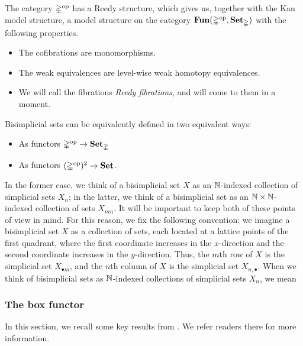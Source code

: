 \documentclass[main.tex]{subfiles}
\begin{document}
\begin{appendix}
  The category $\mathbb{\Delta}^{\mathrm{op}}$ has a Reedy structure, which gives us, together with the Kan model structure, a model structure on the category $\mathbf{Fun}(\mathbb{\Delta}^{\mathrm{op}}, \mathbf{Set}_{\mathbb{\Delta}})$ with the following properties.
  \begin{itemize}
    \item The cofibrations are monomorphisms.

    \item The weak equivalences are level-wise weak homotopy equivalences.

    \item We will call the fibrations \emph{Reedy fibrations,} and will come to them in a moment.
  \end{itemize}



  Bisimplicial sets can be equivalently defined in two equivalent ways:
  \begin{itemize}
    \item As functors $\mathbb{\Delta}^{\mathrm{op}} \to \mathbf{Set}_{\mathbb{\Delta}}$

    \item As functors $(\mathbb{\Delta}^{\mathrm{op}})^{2} \to \mathbf{Set}$.
  \end{itemize}
  In the former case, we think of a bisimplicial set $X$ as an $\mathbb{N}$-indexed collection of simplicial sets $X_{n}$; in the latter, we think of a bisimplicial set as an $\mathbb{N} \times \mathbb{N}$-indexed collection of sets $X_{mn}$. It will be important to keep both of these points of view in mind. For this reason, we fix the following convention: we imagine a bisimplicial set $X$ as a collection of sets, each located at a lattice points of the first quadrant, where the first coordinate increases in the $x$-direction and the second coordinate increases in the $y$-direction. Thus, the $m$th row of $X$ is the simplicial set $X_{\bullet m}$, and the $n$th column of $X$ is the simplicial set $X_{n, \bullet}$. When we think of bisimplicial sets as $\mathbb{N}$-indexed collections of simplicial sets $X_{n}$, we mean 

  \subsubsection{The box functor}
  \label{sss:the_box_functor}

  In this section, we recall some key results from \cite{qcats_vs_segal_spaces}. We refer readers there for more information.


\end{appendix}
\end{document}
